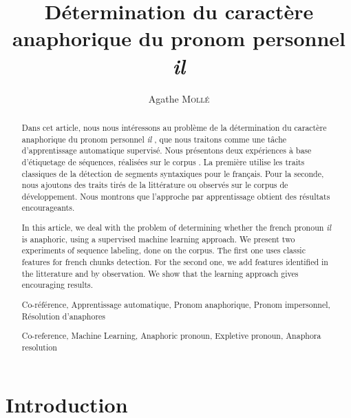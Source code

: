 \documentclass[a4paper,12pt]{article}
\title{Détermination du caractère anaphorique du pronom personnel \og{}\textit{il}\fg{}}
\author{Agathe \textsc{Mollé}}
\date{}
\begin{document}
\maketitle

\begin{abstract}
Dans cet article, nous nous intéressons au problème de la détermination du caractère anaphorique du pronom personnel \og \textit{il} \fg{}, que nous traitons comme une tâche d'apprentissage automatique supervisé. Nous présentons deux expériences à base d'étiquetage de séquences, réalisées sur le corpus \citet{tutin-hal-00373327}. La première utilise les traits classiques de la détection de segments syntaxiques pour le français. Pour la seconde, nous ajoutons des traits tirés de la littérature ou observés sur le corpus de développement. Nous montrons que l'approche par apprentissage obtient des résultats encourageants.
\end{abstract}


\renewcommand\abstractname{Abstract}
\begin{abstract}
In this article, we deal with the problem of determining whether the french pronoun \og \textit{il} \fg{} is anaphoric, using a supervised machine learning approach. We present two experiments of sequence labeling, done on the \citet{tutin-hal-00373327} corpus. The first one uses classic features for french chunks detection. For the second one, we add features identified in the litterature and by observation. We show that the learning approach gives encouraging results.
\end{abstract}


\paragraph{}

\renewcommand\abstractname{Mots-clés}
\begin{abstract}
Co-référence, Apprentissage automatique, Pronom anaphorique, Pronom impersonnel, Résolution d'anaphores
\end{abstract}

\renewcommand\abstractname{Keywords}
\begin{abstract}
Co-reference, Machine Learning, Anaphoric pronoun, Expletive pronoun, Anaphora resolution
\end{abstract}

\section*{Introduction}
\end{document}
